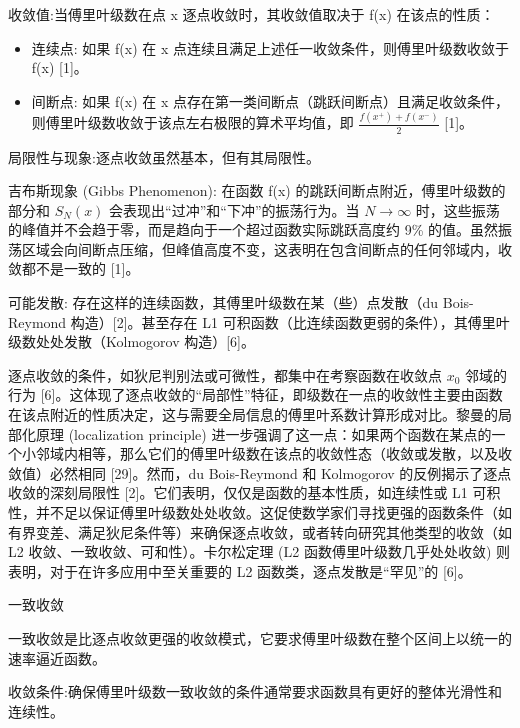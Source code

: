 收敛值:当傅里叶级数在点 x 逐点收敛时，其收敛值取决于 f(x) 在该点的性质：

\begin{itemize}
	\item 连续点: 如果 f(x) 在 x 点连续且满足上述任一收敛条件，则傅里叶级数收敛于 f(x) [1]。
	\item 间断点: 如果 f(x) 在 x 点存在第一类间断点（跳跃间断点）且满足收敛条件，则傅里叶级数收敛于该点左右极限的算术平均值，即 $\frac{f(x^+)+f(x^-)}{2}$ [1]。
\end{itemize}

局限性与现象:逐点收敛虽然基本，但有其局限性。

吉布斯现象 (Gibbs Phenomenon): 在函数 f(x) 的跳跃间断点附近，傅里叶级数的部分和 $S_N(x)$ 会表现出“过冲”和“下冲”的振荡行为。当 $N\to\infty$ 时，这些振荡的峰值并不会趋于零，而是趋向于一个超过函数实际跳跃高度约 9\% 的值。虽然振荡区域会向间断点压缩，但峰值高度不变，这表明在包含间断点的任何邻域内，收敛都不是一致的 [1]。

可能发散: 存在这样的连续函数，其傅里叶级数在某（些）点发散（du Bois-Reymond 构造）[2]。甚至存在 L1 可积函数（比连续函数更弱的条件），其傅里叶级数处处发散（Kolmogorov 构造）[6]。

逐点收敛的条件，如狄尼判别法或可微性，都集中在考察函数在收敛点 $x_0$ 邻域的行为 [6]。这体现了逐点收敛的“局部性”特征，即级数在一点的收敛性主要由函数在该点附近的性质决定，这与需要全局信息的傅里叶系数计算形成对比。黎曼的局部化原理 (localization principle) 进一步强调了这一点：如果两个函数在某点的一个小邻域内相等，那么它们的傅里叶级数在该点的收敛性态（收敛或发散，以及收敛值）必然相同 [29]。然而，du Bois-Reymond 和 Kolmogorov 的反例揭示了逐点收敛的深刻局限性 [2]。它们表明，仅仅是函数的基本性质，如连续性或 L1 可积性，并不足以保证傅里叶级数处处收敛。这促使数学家们寻找更强的函数条件（如有界变差、满足狄尼条件等）来确保逐点收敛，或者转向研究其他类型的收敛（如 L2 收敛、一致收敛、可和性）。卡尔松定理 (L2 函数傅里叶级数几乎处处收敛) 则表明，对于在许多应用中至关重要的 L2 函数类，逐点发散是“罕见”的 [6]。

一致收敛

一致收敛是比逐点收敛更强的收敛模式，它要求傅里叶级数在整个区间上以统一的速率逼近函数。

收敛条件:确保傅里叶级数一致收敛的条件通常要求函数具有更好的整体光滑性和连续性。

